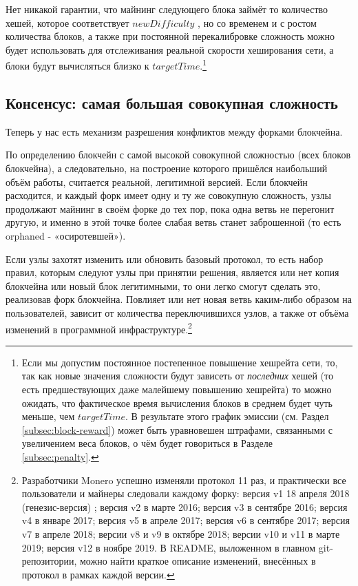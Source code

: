 Нет никакой гарантии, что майнинг следующего блока займёт то количество хешей, которое соответствует $\mathit{newDifficulty}$ , но со временем и с ростом количества блоков, а также при постоянной перекалибровке сложность можно будет использовать для отслеживания реальной скорости хеширования сети, а блоки будут вычисляться близко к $\mathit{targetTime}$.\footnote{Если мы допустим постоянное постепенное повышение хешрейта сети, то, так как новые значения сложности будут зависеть от {\em последних} хешей (то есть предшествующих даже малейшему повышению хешрейта) то можно ожидать, что фактическое время вычисления блоков в среднем будет чуть меньше, чем $\mathit{targetTime}$. В результате этого график эмиссии (см. Раздел \ref{subsec:block-reward}) может быть уравновешен штрафами, связанными с увеличением веса блоков, о чём будет говориться в Разделе \ref{subsec:penalty}.}


\subsection{Консенсус: самая большая совокупная сложность}

Теперь у нас есть механизм разрешения конфликтов между форками блокчейна.

По определению блокчейн с самой высокой совокупной сложностью (всех блоков блокчейна), а следовательно, на построение которого пришёлся наибольший объём работы, считается реальной, легитимной версией. Если блокчейн расходится, и каждый форк имеет одну и ту же совокупную сложность, узлы продолжают майнинг в своём форке до тех пор, пока одна ветвь не перегонит другую, и именно в этой точке более слабая ветвь станет заброшенной (то есть orphaned - «осиротевшей»).%

Если узлы захотят изменить или обновить базовый протокол, то есть набор правил, которым следуют узлы при принятии решения, является или нет копия блокчейна или новый блок легитимными, то они легко смогут сделать это, реализовав форк блокчейна. Повлияет или нет новая ветвь каким-либо образом на пользователей, зависит от количества переключив\-шихся узлов, а также от объёма изменений в программной инфраструктуре.\footnote{Разработчики Monero успешно изменяли протокол 11 раз, и практически все пользователи и майнеры следовали каждому форку: версия v1 18 апреля 2018 (генезис-версия) \cite{bitmonero-launched}; версия v2 в марте 2016; версия v3 в сентябре 2016; версия v4 в январе 2017; версия v5 в апреле 2017; версия v6 в сентябре 2017; версия v7 в апреле 2018; версии v8 и v9 в октябре 2018; версии v10 и v11 в марте 2019; версия v12 в ноябре 2019. В README, выложенном в главном git-репозитории, можно найти краткое описание изменений, внесённых в протокол в рамках каждой версии.}

